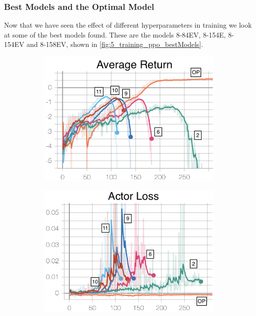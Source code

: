 \subsubsection{Best Models and the Optimal Model}
Now that we have seen the effect of different hyperparameters in training we look at some of the best models found. These are the models 8-84EV, 8-154E, 8-154EV and 8-158EV, shown in \cref{fig:5_training_ppo_bestModels}.
\begin{figure}[hbt]
     \centering
     \begin{subfigure}[b]{0.32\textwidth}
         \centering
         \includegraphics[width=\textwidth]{figures/5_/Training/ppo_bestmodelsAvgReturn.png}
         \caption{}
         \label{fig:5_training_ppo_bestModelsAvgReturn}
     \end{subfigure} 
     \hfill
     \begin{subfigure}[b]{0.32\textwidth}
         \centering
         \includegraphics[width=\textwidth]{figures/5_/Training/ppo_bestmodelsActorL.png}

\end{subfigure}
\end{figure}
